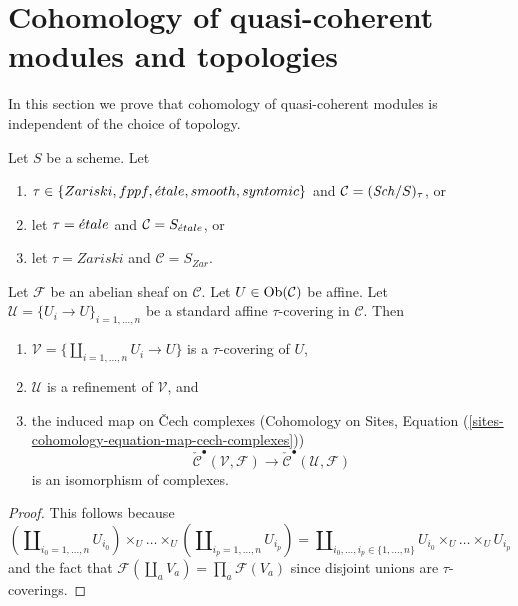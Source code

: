 \section{Cohomology of quasi-coherent modules and topologies}
\label{section-quasi-coherent-cohomology}

\noindent
In this section we prove that cohomology of quasi-coherent
modules is independent of the choice of topology.

\begin{lemma}
\label{lemma-standard-covering-Cech}
Let $S$ be a scheme. Let
\begin{enumerate}
\item[(a)] $\tau \in \{Zariski, \linebreak[0] fppf, \linebreak[0]
\etale, \linebreak[0] smooth, \linebreak[0] syntomic\}$
and $\mathcal{C} = (\mathit{Sch}/S)_\tau$, or
\item[(b)] let $\tau = {\acute{e}tale}$ and $\mathcal{C} = S_{\acute{e}tale}$, or
\item[(c)] let $\tau = Zariski$ and $\mathcal{C} = S_{Zar}$.
\end{enumerate}
Let $\mathcal{F}$ be an abelian sheaf on $\mathcal{C}$.
Let $U \in \mathop{\mathrm{Ob}}\nolimits(\mathcal{C})$ be affine.
Let $\mathcal{U} = \{U_i \to U\}_{i = 1, \ldots, n}$ be a standard affine
$\tau$-covering in $\mathcal{C}$. Then
\begin{enumerate}
\item $\mathcal{V} = \{\coprod_{i = 1, \ldots, n} U_i \to U\}$ is a
$\tau$-covering of $U$,
\item $\mathcal{U}$ is a refinement of $\mathcal{V}$, and
\item the induced map on {\v C}ech complexes
(Cohomology on Sites,
Equation (\ref{sites-cohomology-equation-map-cech-complexes}))
$$
\check{\mathcal{C}}^\bullet(\mathcal{V}, \mathcal{F})
\longrightarrow
\check{\mathcal{C}}^\bullet(\mathcal{U}, \mathcal{F})
$$
is an isomorphism of complexes.
\end{enumerate}
\end{lemma}

\begin{proof}
This follows because
$$
(\coprod\nolimits_{i_0 = 1, \ldots, n} U_{i_0}) \times_U
\ldots \times_U
(\coprod\nolimits_{i_p = 1, \ldots, n} U_{i_p})
=
\coprod\nolimits_{i_0, \ldots, i_p \in \{1, \ldots, n\}}
U_{i_0} \times_U \ldots \times_U U_{i_p}
$$
and the fact that $\mathcal{F}(\coprod_a V_a) = \prod_a \mathcal{F}(V_a)$
since disjoint unions are $\tau$-coverings.
\end{proof}


